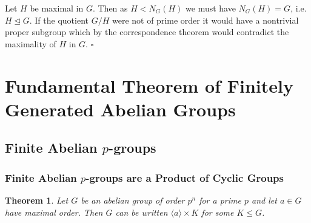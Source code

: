 \documentclass[10pt]{article}
\newtheorem{theorem}{Theorem}[section]
\newenvironment{proof}[1][Proof]{\begin{trivlist}
\item[\hskip \labelsep {\itshape #1}]}{\end{trivlist}}
\begin{document}
\begin{proof}
Let $H$ be maximal in $G$. Then as $H < N_G(H)$ we must have $N_G(H) = G$, i.e. $H \mathrel{\unlhd} G$. If the quotient $G/H$ were not of prime order it would have a nontrivial proper subgroup which by the correspondence theorem would contradict the maximality of $H$ in $G$. $\square$
\end{proof}

\section{Fundamental Theorem of Finitely Generated Abelian Groups}

\subsection{Finite Abelian $p$-groups}

\subsubsection{Finite Abelian $p$-groups are a Product of Cyclic Groups}

\begin{theorem}
Let $G$ be an abelian group of order $p^n$ for a prime $p$ and let $a \in G$ have maximal order. Then $G$ can be written $\langle a \rangle \times K$ for some $K \leq G$.
\end{theorem}
\end{document}
